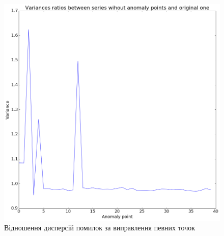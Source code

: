 \begin{figure}[h!]
  \centering
  \includegraphics[width=\textwidth]{Coursework_files/Coursework_15_0.png}
  \caption{Відношення дисперсій помилок за виправлення певних точок}
  \label{fig:anomaly:variance}
\end{figure}


